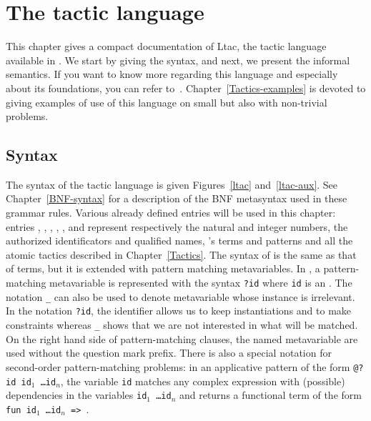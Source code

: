 \chapter[The tactic language]{The tactic language\label{TacticLanguage}}


This chapter gives a compact documentation of Ltac, the tactic
language available in {\Coq}. We start by giving the syntax, and next,
we present the informal semantics. If you want to know more regarding
this language and especially about its foundations, you can refer
to~\cite{Del00}. Chapter~\ref{Tactics-examples} is devoted to giving
examples of use of this language on small but also with non-trivial
problems.


\section{Syntax}

\def\tacexpr{\textrm{\textsl{expr}}}
\def\tacexprlow{\textrm{\textsl{tacexpr$_1$}}}
\def\tacexprinf{\textrm{\textsl{tacexpr$_2$}}}
\def\tacexprpref{\textrm{\textsl{tacexpr$_3$}}}
\def\atom{\textrm{\textsl{atom}}}
\def\letclause{\textrm{\textsl{let\_clause}}}
\def\matchrule{\textrm{\textsl{match\_rule}}}
\def\contextrule{\textrm{\textsl{context\_rule}}}
\def\contexthyp{\textrm{\textsl{context\_hyp}}}
\def\tacarg{\nterm{tacarg}}
\def\cpattern{\nterm{cpattern}}

The syntax of the tactic language is given Figures~\ref{ltac}
and~\ref{ltac-aux}. See Chapter~\ref{BNF-syntax} for a description of
the BNF metasyntax used in these grammar rules. Various already
defined entries will be used in this chapter: entries
{\naturalnumber}, {\integer}, {\ident}, {\qualid}, {\term},
{\cpattern} and {\atomictac} represent respectively the natural and
integer numbers, the authorized identificators and qualified names,
{\Coq}'s terms and patterns and all the atomic tactics described in
Chapter~\ref{Tactics}. The syntax of {\cpattern} is the same as that
of terms, but it is extended with pattern matching metavariables. In
{\cpattern}, a pattern-matching metavariable is represented with the
syntax {\tt ?id} where {\tt id} is an {\ident}. The notation {\tt \_}
can also be used to denote metavariable whose instance is
irrelevant. In the notation {\tt ?id}, the identifier allows us to
keep instantiations and to make constraints whereas {\tt \_} shows
that we are not interested in what will be matched. On the right hand
side of pattern-matching clauses, the named metavariable are used
without the question mark prefix. There is also a special notation for
second-order pattern-matching problems: in an applicative pattern of
the form {\tt @?id id$_1$ \ldots id$_n$}, the variable {\tt id}
matches any complex expression with (possible) dependencies in the
variables {\tt id$_1$ \ldots id$_n$} and returns a functional term of
the form {\tt fun id$_1$ \ldots id$_n$ => {\term}}.


